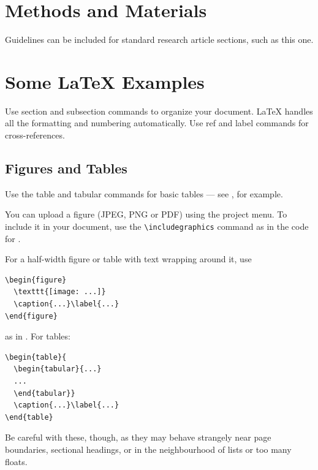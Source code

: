 \documentclass[9pt]{livecoms}
\begin{document}
\section{Methods and Materials}

Guidelines can be included for standard research article sections, such as this one. 

\lipsum[3]

\section{Some \LaTeX{} Examples}
\label{sec:examples}

Use section and subsection commands to organize your document. \LaTeX{} handles all the formatting and numbering automatically. Use ref and label commands for cross-references.

\subsection{Figures and Tables}

Use the table and tabular commands for basic tables --- see , for example. 

You can upload a figure (JPEG, PNG or PDF) using the project menu. To include it in your document, use the \verb|\includegraphics| command as in the code for . 

For a half-width figure or table with text wrapping around it, use 

\begin{verbatim}
\begin{figure}
  \texttt{[image: ...]}
  \caption{...}\label{...}
\end{figure}
\end{verbatim}
%
as in . For tables:

\begin{verbatim}
\begin{table}{
  \begin{tabular}{...}
  ...
  \end{tabular}}
  \caption{...}\label{...}
\end{table}
\end{verbatim}

Be careful with these, though, as they may behave strangely near page boundaries, sectional headings, or in the neighbourhood of lists or too many floats.
\end{document}
